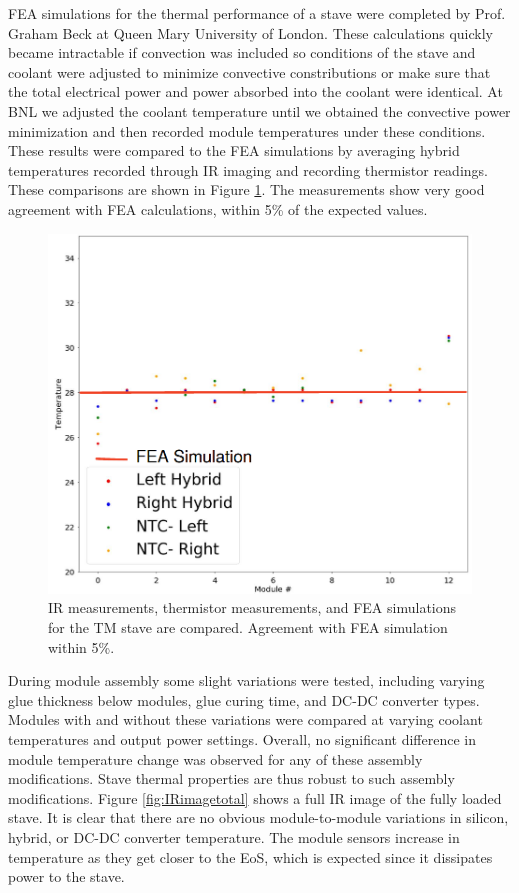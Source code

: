FEA simulations for the thermal performance of a stave were completed by Prof. Graham Beck at Queen Mary University of London. These calculations quickly became intractable if convection was included so conditions of the stave and coolant were adjusted to minimize convective constributions or make sure that the total electrical power and power absorbed into the coolant were identical. At BNL we adjusted the coolant temperature until we obtained the convective power minimization and then recorded module temperatures under these conditions. These results were compared to the FEA simulations by averaging hybrid temperatures recorded through IR imaging and recording thermistor readings. These comparisons are shown in Figure \ref{fig:FEAcompare}. The measurements show very good agreement with FEA calculations, within 5\% of the expected values.

\begin{figure}[!h]
        \centering
    \includegraphics[width=.4\textwidth]{Pictures/FEAcompare.png}
    \caption{IR measurements, thermistor measurements, and FEA simulations for the TM stave are compared. Agreement with FEA simulation within 5\%.}
    \label{fig:FEAcompare}
\end{figure} 

During module assembly some slight variations were tested, including varying glue thickness below modules, glue curing time, and DC-DC converter types. Modules with and without these variations were compared at varying coolant temperatures and output power settings. Overall, no significant difference in module temperature change was observed for any of these assembly modifications. Stave thermal properties are thus robust to such assembly modifications. Figure \ref{fig:IRimagetotal} shows a full IR image of the fully loaded stave. It is clear that there are no obvious module-to-module variations in silicon, hybrid, or DC-DC converter temperature. The module sensors increase in temperature as they get closer to the EoS, which is expected since it dissipates power to the stave.


